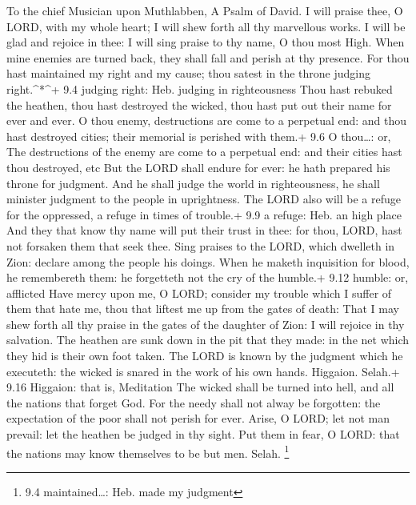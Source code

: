 To the chief Musician upon Muthlabben, A Psalm of David.  I
will praise thee, O LORD, with my whole heart; I will shew forth all thy
marvellous works.  I will be glad and rejoice in thee: I
will sing praise to thy name, O thou most High.  When mine
enemies are turned back, they shall fall and perish at thy presence.
 For thou hast maintained my right and my cause; thou satest
in the throne judging right.\^{}*\^{}+ 9.4 judging right: Heb. judging
in righteousness  Thou hast rebuked the heathen, thou hast
destroyed the wicked, thou hast put out their name for ever and ever.
 O thou enemy, destructions are come to a perpetual end: and
thou hast destroyed cities; their memorial is perished with them.+ 9.6 O
thou\ldots: or, The destructions of the enemy are come to a perpetual
end: and their cities hast thou destroyed, etc  But the LORD
shall endure for ever: he hath prepared his throne for judgment.
 And he shall judge the world in righteousness, he shall
minister judgment to the people in uprightness.  The LORD
also will be a refuge for the oppressed, a refuge in times of trouble.+
9.9 a refuge: Heb. an high place  And they that know thy
name will put their trust in thee: for thou, LORD, hast not forsaken
them that seek thee.  Sing praises to the LORD, which
dwelleth in Zion: declare among the people his doings. 
When he maketh inquisition for blood, he remembereth them: he forgetteth
not the cry of the humble.+ 9.12 humble: or, afflicted 
Have mercy upon me, O LORD; consider my trouble which I suffer of them
that hate me, thou that liftest me up from the gates of death:
 That I may shew forth all thy praise in the gates of the
daughter of Zion: I will rejoice in thy salvation.  The
heathen are sunk down in the pit that they made: in the net which they
hid is their own foot taken.  The LORD is known by the
judgment which he executeth: the wicked is snared in the work of his own
hands. Higgaion. Selah.+ 9.16 Higgaion: that is, Meditation
 The wicked shall be turned into hell, and all the nations
that forget God.  For the needy shall not alway be
forgotten: the expectation of the poor shall not perish for ever.
 Arise, O LORD; let not man prevail: let the heathen be
judged in thy sight.  Put them in fear, O LORD: that the
nations may know themselves to be but men. Selah. \footnote{9.4
  maintained\ldots: Heb. made my judgment}

